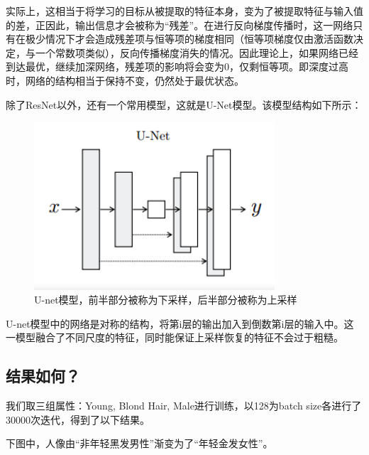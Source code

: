 \documentclass[UTF8,a4paper，12pt]{article}
\theoremstyle{theorem}
\theoremstyle{definition}
\begin{document}
实际上，这相当于将学习的目标从被提取的特征本身，变为了被提取特征与输入值的差，正因此，输出信息才会被称为“残差”。在进行反向梯度传播时，这一网络只有在极少情况下才会造成残差项与恒等项的梯度相同（恒等项梯度仅由激活函数决定，与一个常数项类似），反向传播梯度消失的情况。因此理论上，如果网络已经到达最优，继续加深网络，残差项的影响将会变为0，仅剩恒等项。即深度过高时，网络的结构相当于保持不变，仍然处于最优状态。

除了ResNet以外，还有一个常用模型，这就是U-Net模型。该模型结构如下所示：

\begin{figure}[htbp]
	\centering
	\includegraphics[width=0.8\textwidth]{assets/10}
	\caption{U-net模型，前半部分被称为下采样，后半部分被称为上采样}
\end{figure}

U-net模型中的网络是对称的结构，将第i层的输出加入到倒数第i层的输入中。这一模型融合了不同尺度的特征，同时能保证上采样恢复的特征不会过于粗糙。

\subsection{结果如何？}

我们取三组属性：Young, Blond Hair, Male进行训练，以128为batch size各进行了30000次迭代，得到了以下结果。

下图中，人像由“非年轻黑发男性”渐变为了“年轻金发女性”。
\end{document}
